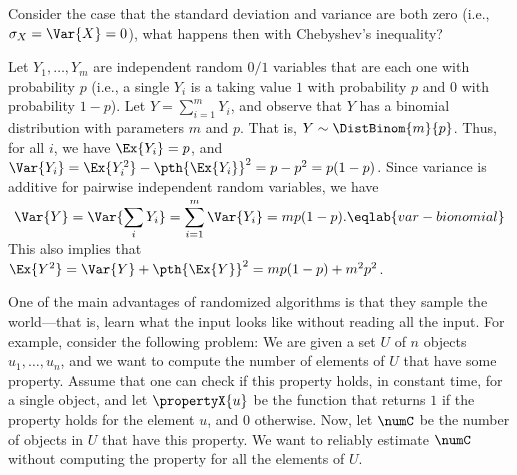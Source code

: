 \begin{exercise}
    Consider the case that the standard deviation and variance are both
    zero (i.e., $\sigma_X = \Var{X} = 0$), what happens then with
    Chebyshev's inequality?
\end{exercise}

\begin{example}
    Let $Y_1, \ldots, Y_m$ are independent random $0/1$ variables that are
    each one with probability $p$ (i.e., a single $Y_i$ is a
     taking value $1$ with probability
    $p$ and $0$ with probability $1-p$).  Let $Y = \sum_{i=1}^m Y_i$, and
    observe that $Y$ has a binomial distribution with parameters $m$ and
    $p$.  That is, $Y \sim \DistBinom{m}{p}$. Thus, for all $i$, we have
    $\Ex{Y_i} = p$, and
    $\Var{Y_i} = \Ex{Y_i^2} - \pth{\Ex{Y_i}}^2 = p - p^2 = p(1-p)$. Since
    variance is additive for pairwise independent random variables, we
    have
    \begin{equation}
        \Var{Y} = \Var{\Bigl. \smash{\sum_i Y_i}} =
        \smash{\sum_{i=1}^m \Var{Y_i}} = m p (1-p).
        \eqlab{var-bionomial}
    \end{equation}
    This also implies that
    $\Ex{\smash{Y^2}} = \Var{Y} + \pth{\Ex{Y}}^2 = m p (1-p) + m^2 p^2$.
\end{example}










One of the main advantages of randomized algorithms is that they sample
the world---that is, learn what the input looks like without reading all
the input. For example, consider the following problem: We are given a
set $U$ of $n$ objects $u_1, \ldots, u_n$, and we want to compute the number
of elements of $U$ that have some property. Assume that one can check if
this property holds, in constant time, for a single object, and let
$\propertyX{u}$ be the function that returns $1$ if the property holds
for the element $u$, and $0$ otherwise.  Now, let $\numC$ be the number
of objects in $U$ that have this property. We want to reliably estimate
$\numC$ without computing the property for all the elements of $U$.

